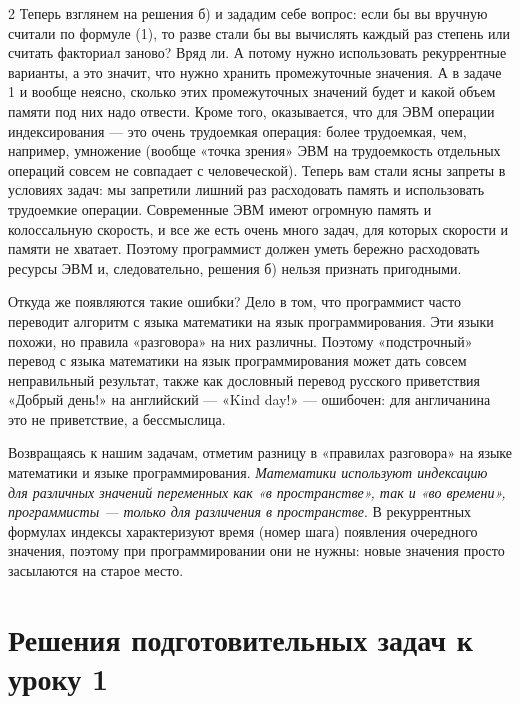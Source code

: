 \documentclass[14pt, a4paper]{article}
\begin{document}
\begin{multicols}{2}
\indent Теперь взглянем на решения б) и зададим себе вопрос: если бы вы вручную считали по формуле (1), то разве стали бы вы вычислять каждый раз степень или считать факториал заново? Вряд ли. А потому нужно использовать рекуррентные варианты, а это значит, что нужно хранить промежуточные значения. А в задаче 1 и вообще неясно, сколько этих промежуточных значений будет и какой объем памяти под них надо отвести. Кроме того, оказывается, что для ЭВМ операции индексирования — это очень трудоемкая операция: более трудоемкая, чем, например, умножение (вообще «точка зрения» ЭВМ на трудоемкость отдельных операций совсем не совпадает с человеческой). Теперь вам стали ясны запреты в условиях задач: мы запретили лишний раз расходовать память и использовать трудоемкие операции. Современные ЭВМ имеют огромную память и колоссальную скорость, и все же есть очень много задач, для которых скорости и памяти не хватает. Поэтому программист должен уметь бережно расходовать ресурсы ЭВМ и, следовательно, решения б) нельзя признать пригодными.

\indent Откуда же появляются такие ошибки? Дело в том, что программист часто переводит алгоритм с языка математики на язык программирования. Эти языки похожи, но правила «разговора» на них различны. Поэтому «подстрочный» перевод с языка математики на язык программирования может дать совсем неправильный результат, также как дословный перевод русского приветствия «Добрый день!» на английский — «Kind day!» — ошибочен: для англичанина это не приветствие, а бессмыслица.

\indent Возвращаясь к нашим задачам, отметим разницу в «правилах разговора» на языке математики и языке программирования. \textit{Математики используют индексацию для различных значений переменных как «в пространстве», так и «во времени», программисты — только для различения в пространстве}. В рекуррентных формулах индексы характеризуют время (номер шага) появления очередного значения, поэтому при программировании 
они не нужны: новые значения просто засылаются на старое место.

\vfill
\end{multicols} %

\clearpage
\setcounter{page}{54}
\setlength{\tabcolsep}{10pt} %
\renewcommand{\arraystretch}{1.5} %

\centering
\section*{Решения подготовительных задач к уроку 1}
\end{document}
